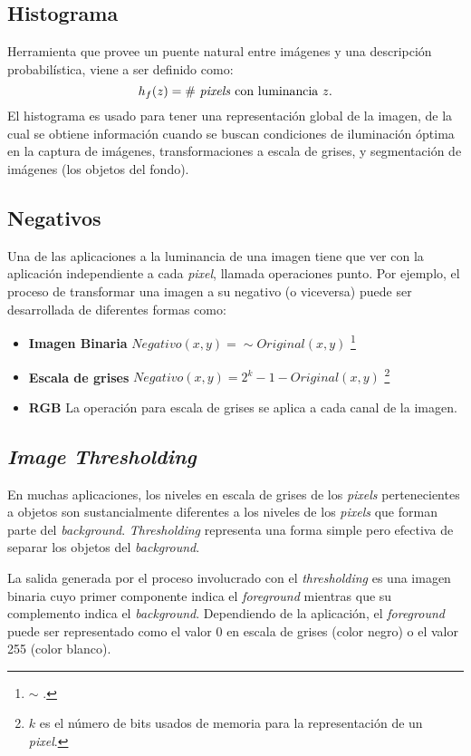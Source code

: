   \subsection{Histograma}
    Herramienta que provee un puente natural entre imágenes y una descripción 
    probabilística, viene a ser definido como:
		$$
		h_f(z)= \# \text{ \textit{pixels} con luminancia } z.
		$$
    El histograma es usado para tener una representación global de la imagen, 
    de la cual se obtiene información cuando se buscan condiciones de 
    iluminación óptima en la captura de imágenes, transformaciones a escala de
    grises, y segmentación de imágenes (los objetos del fondo).

  \subsection{Negativos}
    Una de las aplicaciones a la luminancia de una imagen tiene que ver con 
    la aplicación independiente a cada \textit{pixel}, llamada operaciones 
    punto. Por ejemplo, el proceso de transformar una imagen a su negativo 
    (o viceversa) puede ser desarrollada de diferentes formas como:
      \begin{itemize}
        \item \textbf{Imagen Binaria} $Negativo(x,y) = \sim Original(x,y)$ 
        \footnote{$\sim$ .}
        \item \textbf{Escala de grises} $Negativo(x,y) = 2^k-1-Original(x,y)$
        \footnote{$k$ es el número de bits usados de memoria para la 
        representación de un \textit{pixel}.}
        \item \textbf{RGB} La operación para escala de grises se aplica a cada
        canal de la imagen.
      \end{itemize}
        
  \subsection{\textit{Image Thresholding}}
 	En muchas aplicaciones, los niveles en escala de grises de los 
 	\textit{pixels} pertenecientes a objetos son sustancialmente diferentes a 
 	los niveles de los \textit{pixels} que forman parte del \textit{background}.
 	\textit{Thresholding} representa una forma simple pero efectiva de separar 
 	los objetos del \textit{background}.
 	
 	La salida generada por el proceso involucrado con el \textit{thresholding} 
 	es una imagen binaria cuyo primer componente indica el \textit{foreground} 
 	mientras que su complemento indica el \textit{background}. Dependiendo de la 
 	aplicación, el \textit{foreground} puede ser representado como el valor 0 en 
 	escala de grises (color negro) o el valor 255 (color blanco).
 	
